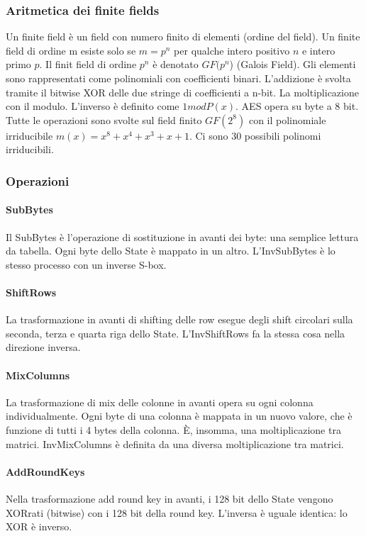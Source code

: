 \documentclass[11pt]{article}
\begin{document}
\subsubsection{Aritmetica dei finite fields}
Un finite field è un field con numero finito di elementi (ordine del field). Un finite field di ordine m esiste solo se $m=p^n$ per qualche intero positivo $n$ e intero primo $p$.
Il finit field di ordine $p^n$ è denotato $GF(p^n$) (Galois Field). Gli elementi sono rappresentati come polinomiali con coefficienti binari. L'addizione è svolta tramite il bitwise XOR delle due stringe di coefficienti a n-bit. La moltiplicazione con il modulo. L'inverso è definito come $1 mod P(x)$. AES opera su byte a 8 bit. Tutte le operazioni sono svolte sul field finito $GF(2^8)$ con il polinomiale irriducibile $m(x) = x^8 + x^4 + x^3 + x + 1$. Ci sono 30 possibili polinomi irriducibili. 
\subsubsection{Operazioni}
\paragraph{SubBytes} Il SubBytes è l'operazione di sostituzione in avanti dei byte: una semplice lettura da tabella. Ogni byte dello State è mappato in un altro. L'InvSubBytes è lo stesso processo con un inverse S-box.
\paragraph{ShiftRows} La trasformazione in avanti di shifting delle row esegue degli shift circolari sulla seconda, terza e quarta riga dello State. L'InvShiftRows fa la stessa cosa nella direzione inversa.
\paragraph{MixColumns} La trasformazione di mix delle colonne in avanti opera su ogni colonna individualmente. Ogni byte di una colonna è mappata in un nuovo valore, che è funzione di tutti i 4 bytes della colonna. È, insomma, una moltiplicazione tra matrici.
InvMixColumns è definita da una diversa moltiplicazione tra matrici.
\paragraph{AddRoundKeys} Nella trasformazione add round key in avanti, i 128 bit dello State vengono XORrati (bitwise) con i 128 bit della round key. L'inversa è uguale identica: lo XOR è inverso.
\end{document}
